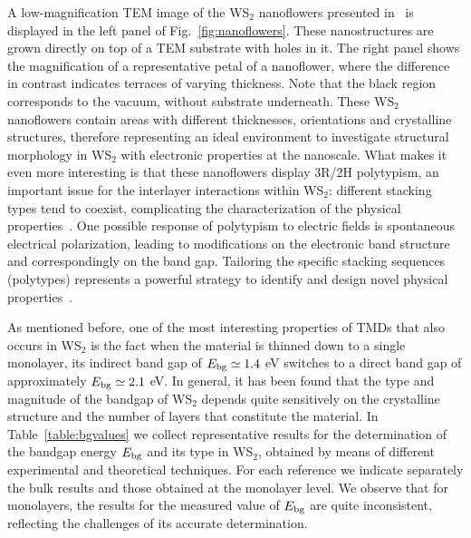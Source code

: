 A low-magnification TEM image of the WS$_2$ nanoflowers presented in~\cite{SabryaWS2} is displayed
in the left panel of Fig.~\ref{fig:nanoflowers}.
%
These nanostructures are grown directly on top of a TEM substrate with holes in it. 
%
The right panel shows the magnification of a representative petal of a nanoflower,
where the difference in contrast indicates terraces of varying thickness.
%
Note that the black region corresponds to the vacuum, without
substrate underneath.
%
These WS$_2$ nanoflowers contain areas with different thicknesses, orientations
and crystalline structures, therefore representing an ideal environment to investigate
structural morphology in WS$_2$ with electronic properties at the nanoscale.
%
What makes it even more interesting is that these nanoflowers display 3R/2H polytypism, 
an important issue for the interlayer
 interactions within WS$_2$: different stacking types tend to coexist, 
 complicating the characterization of the physical properties~\cite{Na:2018}.
%
One possible response of polytypism to electric fields is
 spontaneous electrical polarization, leading to modifications on the 
 electronic band structure and correspondingly on the band gap.
Tailoring the specific stacking sequences (polytypes) 
represents a powerful strategy to identify and design novel physical properties~\cite{SabryaWS2}.
%

As mentioned before, one of the most interesting properties of TMDs that also
occurs in WS$_2$ is the fact when the material
is thinned down to a single monolayer, its indirect band gap of
$E_{\rm bg}\simeq 1.4$ eV
switches to a direct band gap of approximately $E_{\rm bg}\simeq 2.1$ eV.
%
In general, it has been found that the type and magnitude of the bandgap
of WS$_2$ depends quite sensitively on the crystalline structure and
the number of layers that constitute the material.
%
In Table~\ref{table:bgvalues} we collect
representative results for the determination of the bandgap energy $E_{\rm bg}$
and its type in WS$_2$, obtained by means of different experimental and theoretical techniques.
%
For each reference we indicate separately the bulk results and those
obtained at the monolayer level.
%
We observe that for monolayers, the results for the measured
value of $E_{\rm bg}$ are quite inconsistent, 
reflecting the challenges of its accurate determination.


